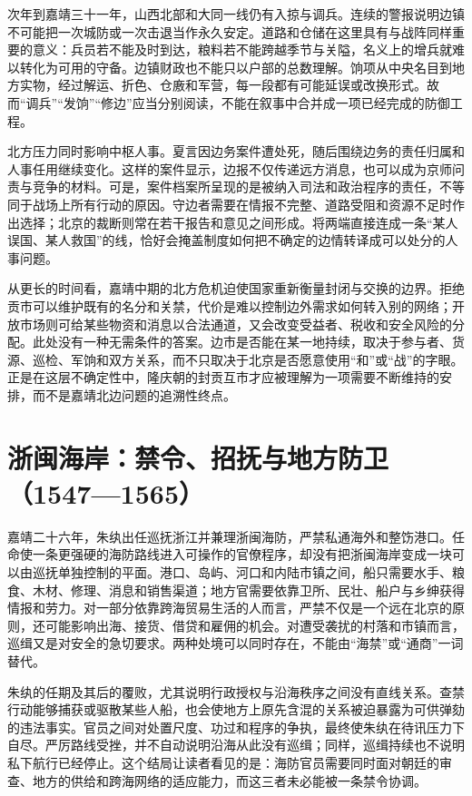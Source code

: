 次年到嘉靖三十一年，山西北部和大同一线仍有入掠与调兵。连续的警报说明边镇不可能把一次城防或一次击退当作永久安定。道路和仓储在这里具有与战阵同样重要的意义：兵员若不能及时到达，粮料若不能跨越季节与关隘，名义上的增兵就难以转化为可用的守备。边镇财政也不能只以户部的总数理解。饷项从中央名目到地方实物，经过解运、折色、仓廒和军营，每一段都有可能延误或改换形式。故而“调兵”“发饷”“修边”应当分别阅读，不能在叙事中合并成一项已经完成的防御工程。

北方压力同时影响中枢人事。夏言因边务案件遭处死，随后围绕边务的责任归属和人事任用继续变化。这样的案件显示，边报不仅传递远方消息，也可以成为京师问责与竞争的材料。可是，案件档案所呈现的是被纳入司法和政治程序的责任，不等同于战场上所有行动的原因。守边者需要在情报不完整、道路受阻和资源不足时作出选择；北京的裁断则常在若干报告和意见之间形成。将两端直接连成一条“某人误国、某人救国”的线，恰好会掩盖制度如何把不确定的边情转译成可以处分的人事问题。

从更长的时间看，嘉靖中期的北方危机迫使国家重新衡量封闭与交换的边界。拒绝贡市可以维护既有的名分和关禁，代价是难以控制边外需求如何转入别的网络；开放市场则可给某些物资和消息以合法通道，又会改变受益者、税收和安全风险的分配。此处没有一种无需条件的答案。边市是否能在某一地持续，取决于参与者、货源、巡检、军饷和双方关系，而不只取决于北京是否愿意使用“和”或“战”的字眼。正是在这层不确定性中，隆庆朝的封贡互市才应被理解为一项需要不断维持的安排，而不是嘉靖北边问题的追溯性终点。

\section{浙闽海岸：禁令、招抚与地方防卫（1547—1565）}

嘉靖二十六年，朱纨出任巡抚浙江并兼理浙闽海防，严禁私通海外和整饬港口。任命使一条更强硬的海防路线进入可操作的官僚程序，却没有把浙闽海岸变成一块可以由巡抚单独控制的平面。港口、岛屿、河口和内陆市镇之间，船只需要水手、粮食、木材、修理、消息和销售渠道；地方官需要依靠卫所、民壮、船户与乡绅获得情报和劳力。对一部分依靠跨海贸易生活的人而言，严禁不仅是一个远在北京的原则，还可能影响出海、接货、借贷和雇佣的机会。对遭受袭扰的村落和市镇而言，巡缉又是对安全的急切要求。两种处境可以同时存在，不能由“海禁”或“通商”一词替代。

朱纨的任期及其后的覆败，尤其说明行政授权与沿海秩序之间没有直线关系。查禁行动能够捕获或驱散某些人船，也会使地方上原先含混的关系被迫暴露为可供弹劾的违法事实。官员之间对处置尺度、功过和程序的争执，最终使朱纨在待讯压力下自尽。严厉路线受挫，并不自动说明沿海从此没有巡缉；同样，巡缉持续也不说明私下航行已经停止。这个结局让读者看见的是：海防官员需要同时面对朝廷的审查、地方的供给和跨海网络的适应能力，而这三者未必能被一条禁令协调。

